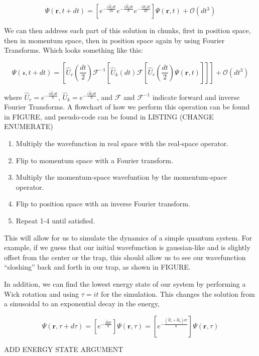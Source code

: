 $$
\Psi(\mathbf{r},t+dt) = \left[e^{-\frac{i\hat{H}_rdt}{2\hbar}}e^{-\frac{i\hat{H}_kdt}{\hbar}}e^{-\frac{i\hat{H}_rdt}{2\hbar}} \right]\Psi(\mathbf{r},t) + \mathcal{O}(dt^3)
$$

We can then address each part of this solution in chunks, first in position space, then in momentum space, then in position space again by using Fourier Transforms.
Which looks something like this:

$$
\Psi(\mathcal{r}, t+dt) = \left[\hat{U}_r\left(\frac{dt}{2}\right)\mathcal{F}^{-1}\left[\hat{U}_k(dt) \mathcal{F} \left[\hat{U}_r\left(\frac{dt}{2}\right) \Psi(\mathbf{r},t) \right] \right] \right] + \mathcal{O}(dt^3)
$$

where $\hat{U}_r = e^{-\frac{i\hat{H}_rdt}{\hbar}}$, $\hat{U}_k = e^{-\frac{i\hat{H}_kdt}{\hbar}}$, and $\mathcal{F}$ and $\mathcal{F}^{-1}$ indicate forward and inverse Fourier Transforms.
A flowchart of how we perform this operation can be found in FIGURE, and pseudo-code can be found in LISTING (CHANGE ENUMERATE)

\begin{enumerate}
\item Multiply the wavefunction in real space with the real-space operator.
\item Flip to momentum space with a Fourier transform.
\item Multiply the momentum-space wavefuntion by the momentum-space operator.
\item Flip to position space with an inverse Fourier transform.
\item Repeat 1-4 until satisfied.
\end{enumerate}

This will allow for us to simulate the dynamics of a simple quantum system.
For example, if we guess that our initial wavefunction is gaussian-like and is slightly offset from the center or the trap, this should allow us to see our wavefunction ``sloshing'' back and forth in our trap, as shown in FIGURE.

In addition, we can find the lowest energy state of our system by performing a Wick rotation and using $\tau = it$ for the simulation.
This changes the solution from a sinusoidal to an exponential decay in the energy,

$$
\Psi(\mathbf{r},\tau + d\tau) = \left[e^{-\frac{\hat{H}d\tau}{\hbar}}\right]\Psi(\mathbf{r},\tau) = \left[e^{-\frac{(\hat{H}_r + \hat{H}_k)d\tau}{\hbar}}\right]\Psi(\mathbf{r},\tau)
$$

ADD ENERGY STATE ARGUMENT

